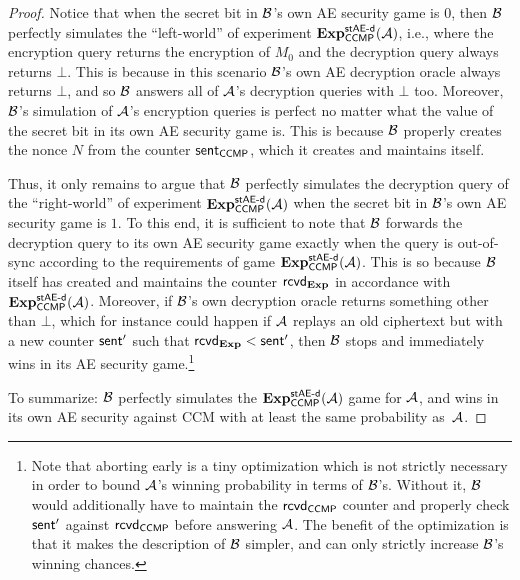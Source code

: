 \begin{proof}
Notice that when the secret bit in $\A[B]$'s own AE security game is $0$,
then $\A[B]$ perfectly simulates the ``left-world'' of experiment $\Exp_{\ccmp}^{\staesecd}(\A)$,
i.e., where the encryption query returns the encryption of $M_0$ and the decryption query always returns $\bot$.
This is because in this scenario $\A[B]$'s own AE decryption oracle always returns $\bot$,
and so $\A[B]$ answers all of $\A$'s decryption queries with $\bot$ too.
Moreover,
$\A[B]$'s simulation of $\A$'s encryption queries is perfect no matter what the value of the secret bit in its own AE security game is.
This is because $\A[B]$ properly creates the nonce $N$ from the counter $\sent_\ccmp$,
which it creates and maintains itself.


Thus,
it only remains to argue that $\A[B]$ perfectly simulates the decryption query of the ``right-world'' of experiment $\Exp_{\ccmp}^{\staesecd}(\A)$
when the secret bit in $\A[B]$'s own AE security game is $1$.
To this end,
it is sufficient to note that $\A[B]$ forwards the decryption query to its own AE security game exactly when the query is out-of-sync according to the requirements of game $\Exp_{\ccmp}^{\staesecd}(\A)$.
This is so because $\A[B]$ itself has created and maintains the counter $\received_\Exp$ in accordance with $\Exp_{\ccmp}^{\staesecd}(\A)$.
Moreover,
if $\A[B]$'s own decryption oracle returns something other than $\bot$,
which for instance could happen if $\A$ replays an old ciphertext but with a new counter $\sent'$ such that $\received_\Exp < \sent'$,
then $\A[B]$ stops and immediately wins in its AE security game.\footnote{Note
that aborting early is a tiny optimization which is not strictly necessary in order to bound $\A$'s winning probability in terms of $\A[B]$'s.
Without it,
$\A[B]$ would additionally have to maintain the $\received_\ccmp$ counter and properly check $\sent'$ against $\received_\ccmp$ before answering $\A$.
The benefit of the optimization is that it makes the description of $\A[B]$ simpler,
and can only strictly increase $\A[B]$'s winning chances. 
}

To summarize:
$\A[B]$ perfectly simulates the $\Exp_{\ccmp}^{\staesecd}(\A)$ game for $\A$,
and wins in its own AE security against CCM with at least the same probability as~$\A$.
\end{proof}

